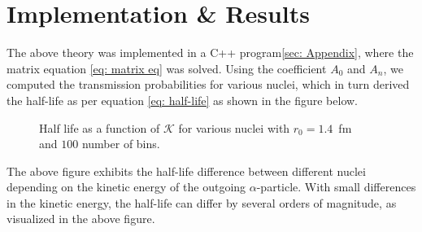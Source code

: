 \documentclass[a4paper]{article}
\newcommand{\newparagraph}{\vspace{.5cm}\noindent}
\begin{document}
\begin{comment}
\newparagraph
The kinematics of the system leads to the following expression for the kinetic energy of the outgoing $\alpha$-particle:
\begin{align*}
    \mathcal{K} &= \frac{1}{2}m_\mu v_{eff}^2,
\end{align*}where $m_\mu$ is the reduced mass of the $\alpha$-particle and the daughter nuclei, and $v_{eff}$ is the effective velocity of the system.
\end{comment}

\newpage
\section{Implementation \& Results}
The above theory was implemented in a C++ program\ref{sec: Appendix}, where the matrix equation \eqref{eq: matrix eq} was solved.
Using the coefficient $A_0$ and $A_n$, we computed the transmission probabilities for various nuclei, which in turn derived the half-life as per equation \eqref{eq: half-life} as shown in the figure below.
\begin{figure}[H]
    \centering
    \caption{Half life as a function of $\mathcal{K}$ for various nuclei with $r_0 = 1.4$~fm \\and $100$ number of bins.}
\end{figure}\noindent
The above figure exhibits the half-life difference between different nuclei depending on the kinetic energy of the outgoing $\alpha$-particle.
With small differences in the kinetic energy, the half-life can differ by several orders of magnitude, as visualized in the above figure.
\end{document}
